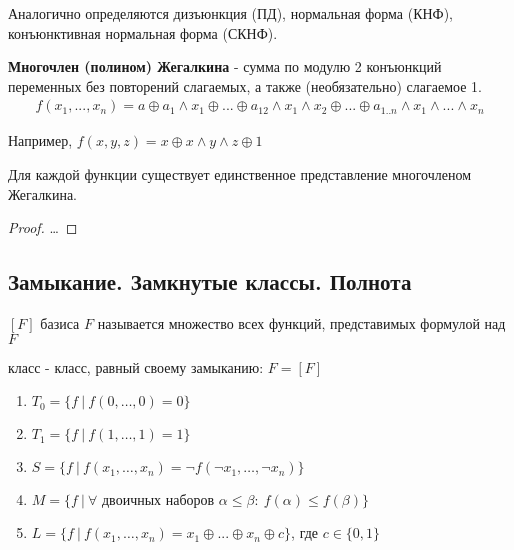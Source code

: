 \documentclass[a4paper, 14pt]{article}
\begin{document}
    Аналогично определяются { дизъюнкция} (ПД), { нормальная форма} (КНФ),
    { конъюнктивная нормальная форма} (СКНФ).

    \begin{definition}
        {\bf Многочлен (полином) Жегалкина} - сумма по модулю 2 конъюнкций переменных
        без повторений слагаемых, а также (необязательно) слагаемое 1.
        \begin{align*}
            f(x_1, ..., x_n) = a \oplus a_1 \wedge x_1 \oplus ... \oplus 
            a_{12} \wedge x_1 \wedge x_2 
            \oplus ... \oplus a_{1..n} \wedge x_1 \wedge ... \wedge x_n
        \end{align*}
    \end{definition}

    Например, $f(x, y, z) = x \oplus x \wedge y \wedge z \oplus 1$ 

    \begin{theorem}
        Для каждой функции существует единственное представление многочленом Жегалкина.
    \end{theorem}
    \begin{proof}[Proof]
        \dots
    \end{proof}
    
    \subsection{Замыкание. Замкнутые классы. Полнота}
    
    \begin{definition}
        { $[F]$} базиса $F$ называется множество всех
        функций, представимых формулой над $F$
    \end{definition}
    \begin{definition}
        { класс} - класс, равный своему замыканию: $F = [F]$
    \end{definition}

    \begin{enumerate}
        \item $T_0 = \{f \ \vert \ f(0, \dots, 0) = 0\}$
        \item $T_1 = \{f \ \vert \ f(1, \dots, 1) = 1\}$
        \item $S = \{f \ \vert \ f(x_1, \dots, x_n) = \lnot f(\lnot x_1, \dots, \lnot x_n)\}$
        \item $M = \{f \ \vert \ \forall \text{ двоичных наборов } \alpha \leq \beta: \
        f(\alpha) \leq f(\beta)\}$
        \item $L = \{f \ \vert \ f(x_1, \dots, x_n) = x_1 \oplus ... \oplus x_n \oplus c\}$, где $c \in \{0, 1\}$
    \end{enumerate}
    
\end{document}
